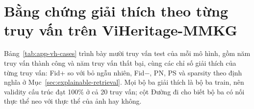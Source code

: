 
\section{Bằng chứng giải thích theo từng truy vấn trên ViHeritage-MMKG}
\label{app:vh-cases}



Bảng~\ref{tab:app-vh-cases} trình bày mười truy vấn test của mỗi mô hình, gồm năm truy vấn thành công và năm truy vấn thất bại, cùng các chỉ số giải thích của từng truy vấn: Fid+ so với bỏ ngẫu nhiên, Fid$-$, PN, PS và sparsity theo định nghĩa ở Mục~\ref{sec:explainable-retrieval}. Mọi bộ ba giải thích là bộ ba train, nên validity cấu trúc đạt 100\% ở cả 20 truy vấn; cột Đường đi cho biết bộ ba có nối thực thể neo với thực thể của ảnh hay không.

